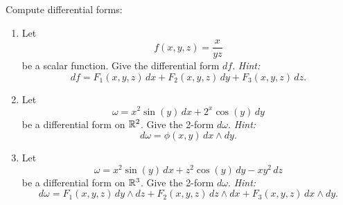 \documentclass[11pt]{article}
\begin{document}
\begin{exercise}
	Compute differential forms:
	\begin{enumerate}
		\item Let
		      $$
			      f(x,y,z) = \frac{x}{yz}
		      $$
		      be a scalar function. Give the differential form $df$.
		      \newline \emph{Hint:}
		      $$
			      df = F_1(x,y,z) \, dx + F_2(x,y,z) \, dy + F_3(x,y,z) \, dz.
		      $$
		\item Let
		      $$
			      \omega = x^2 \sin(y) \, dx + 2^x \cos(y) \, dy
		      $$
		      be a differential form on $\mathbb{R}^2$. Give the 2-form $d\omega$.
		      \newline \emph{Hint:}
		      $$
			      d\omega = \phi(x,y) \, dx \wedge dy.
		      $$
		\item Let
		      $$
			      \omega = x^2 \sin(y) \, dx + z^2 \cos(y) \, dy - xy^2 \, dz
		      $$
		      be a differential form on $\mathbb{R}^3$. Give the 2-form $d\omega$.
		      \newline \emph{Hint:}
		      $$
			      d\omega = F_1(x,y,z) \, dy \wedge dz + F_2(x,y,z) \, dz \wedge dx + F_3(x,y,z) \, dx \wedge dy.
		      $$
	\end{enumerate}
\end{exercise}
\end{document}

